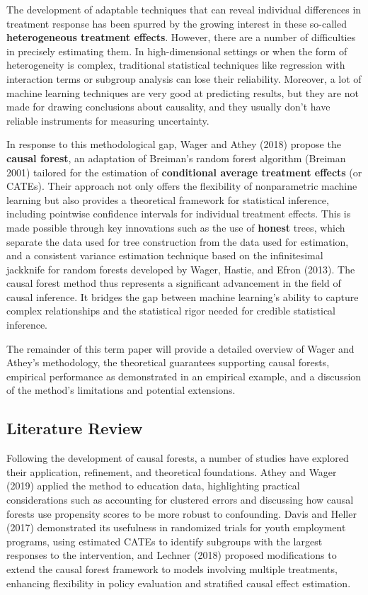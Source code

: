 \documentclass[
  12pt,
  a4paper,
  oneside]{article}
\begin{document}
\qquad The development of adaptable techniques that can reveal
individual differences in treatment response has been spurred by the
growing interest in these so-called
\textbf{heterogeneous treatment effects}. However, there are a number of
difficulties in precisely estimating them. In high-dimensional settings
or when the form of heterogeneity is complex, traditional statistical
techniques like regression with interaction terms or subgroup analysis
can lose their reliability. Moreover, a lot of machine learning
techniques are very good at predicting results, but they are not made
for drawing conclusions about causality, and they usually don't have
reliable instruments for measuring uncertainty.

\qquad In response to this methodological gap, Wager and Athey (2018)
propose the \textbf{causal forest}, an adaptation of Breiman's random
forest algorithm (Breiman 2001) tailored for the estimation of
\textbf{conditional
average treatment effects} (or CATEs). Their approach not only offers
the flexibility of nonparametric machine learning but also provides a
theoretical framework for statistical inference, including pointwise
confidence intervals for individual treatment effects. This is made
possible through key innovations such as the use of \textbf{honest}
trees, which separate the data used for tree construction from the data
used for estimation, and a consistent variance estimation technique
based on the infinitesimal jackknife for random forests developed by
Wager, Hastie, and Efron (2013). The causal forest method thus
represents a significant advancement in the field of causal inference.
It bridges the gap between machine learning's ability to capture complex
relationships and the statistical rigor needed for credible statistical
inference.

\qquad The remainder of this term paper will provide a detailed overview
of Wager and Athey's methodology, the theoretical guarantees supporting
causal forests, empirical performance as demonstrated in an empirical
example, and a discussion of the method's limitations and potential
extensions.

\subsection{Literature Review}\label{literature-review}

Following the development of causal forests, a number of studies have
explored their application, refinement, and theoretical foundations.
Athey and Wager (2019) applied the method to education data,
highlighting practical considerations such as accounting for clustered
errors and discussing how causal forests use propensity scores to be
more robust to confounding. Davis and Heller (2017) demonstrated its
usefulness in randomized trials for youth employment programs, using
estimated CATEs to identify subgroups with the largest responses to the
intervention, and Lechner (2018) proposed modifications to extend the
causal forest framework to models involving multiple treatments,
enhancing flexibility in policy evaluation and stratified causal effect
estimation.
\end{document}
